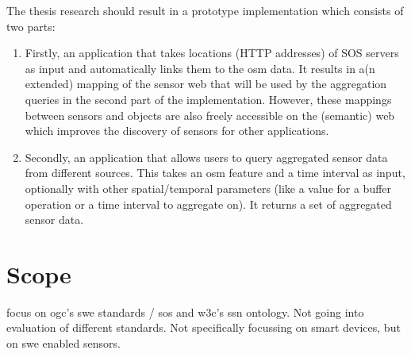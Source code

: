 The thesis research should result in a prototype implementation which consists of two parts: 
\begin{enumerate}
	\item Firstly, an application that takes locations (HTTP addresses) of SOS servers as input and automatically links them to the \ac{osm} data. It results in a(n extended) mapping of the sensor web that will be used by the aggregation queries in the second part of the implementation. However, these mappings between sensors and objects are also freely accessible on the (semantic) web which improves the discovery of sensors for other applications.
	\item Secondly, an application that allows users to query aggregated sensor data from different sources. This takes an \ac{osm} feature and a time interval as input, optionally with other spatial/temporal parameters (like a value for a buffer operation or a time interval to aggregate on). It returns a set of aggregated sensor data. 
\end{enumerate}


\section{Scope} 
focus on \ac{ogc}'s \ac{swe} standards / \ac{sos} and \ac{w3c}'s \ac{ssn} ontology. Not going into evaluation of different standards. Not specifically focussing on smart devices, but on \ac{swe} enabled sensors.
\fi